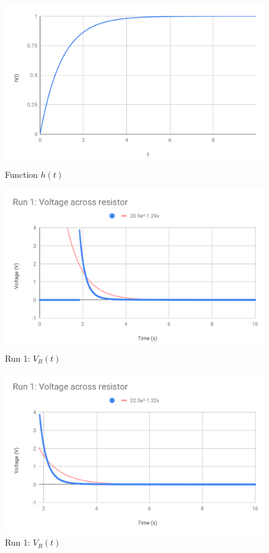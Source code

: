 \begin{figure}[ht]
    \centering
    \includegraphics[scale=0.74]{image/05-RC-RL/h.pdf}
    \caption{Function $h(t)$}
    \label{figure.05.h}
\end{figure}
\begin{figure}[ht]
    \centering
    \includegraphics[scale=0.74]{image/05-RC-RL/run-1-vR-full.pdf}
    \caption{Run 1: $V_{R}(t)$}
    \label{figure.05.run.1.vR.full}
\end{figure}
\begin{figure}[ht]
    \centering
    \includegraphics[scale=0.74]{image/05-RC-RL/run-1-vR-truncated.pdf}
    \caption{Run 1: $V_{R}(t)$}
    \label{figure.05.run.1.vR.truncated}
\end{figure}
